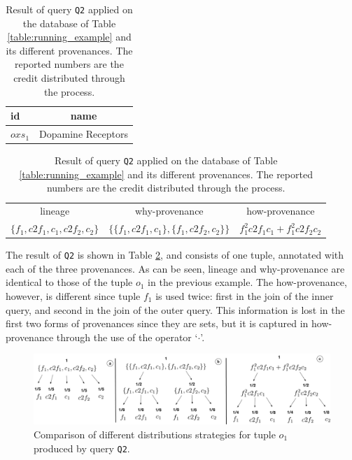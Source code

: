 \begin{table}[]
\centering
  \begin{tabular}{|l|c|}
  \hline
    id & name\\
    \hline
    $oxs_1$ &  Dopamine Receptors\\
    \hline
  \end{tabular}
  \newline
\vspace{2mm}
  \begin{tabular}{c | c | c}
  	lineage & why-provenance & how-provenance   \\
  	$\{f_1, c2f_1, c_1, c2f_2, c_2\}$ & $\{\{f_1, c2f_1, c_1\}, \{f_1, c2f_2, c_2\}\}$ & $f_1^2 c2f_1 c_1 + f_1^2 c2f_2 c_2$\\
  \end{tabular}
    \caption{Result of query \texttt{Q2} applied on the database of Table \ref{table:running_example} and its different provenances. The reported numbers are the credit distributed through the process.}
  \label{table:difference_result}
\end{table}

The result of \texttt{Q2} is shown in Table \ref{table:difference_result}, and consists of one tuple, annotated with each of the three provenances. As can be seen, lineage and why-provenance are identical to those of the tuple $o_1$ in the previous example. 
The how-provenance, however, is different since tuple $f_1$ is used twice: first in the join of the inner query, and second in the join of the outer query. This information is lost in the first two forms of provenances since they are sets, but it is captured in how-provenance through the use of the operator `$\cdot$'.


\begin{figure}[]
  \includegraphics[width=\textwidth]{figures/how_distribution}
  \caption{Comparison of different distributions strategies for tuple $o_1$ produced by query \texttt{Q2}.}
  \label{figure:distributions_differences}
\end{figure}


